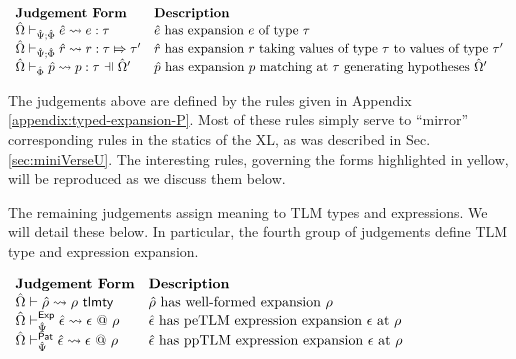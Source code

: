 \vspace{6px}
$\begin{array}{ll}
\textbf{Judgement Form} & \textbf{Description}\\
\expandsPX{\ue}{e}{\tau} & \text{$\ue$ has expansion $e$ of type $\tau$}\\
\rExpandsSP{\uOmega}{\uPsi}{\uPhi}{\urv}{r}{\tau}{\tau'} & \text{$\urv$ has expansion $r$ taking values of type $\tau$ to values of type $\tau'$}\\
\patExpandsP{\uOmega'}{\uPhi}{\upv}{p}{\tau} & \text{$\upv$ has expansion $p$ matching at $\tau$  generating hypotheses $\uOmega'$}
\end{array}$
\vspace{6px}

The judgements above are defined by the rules given in Appendix \ref{appendix:typed-expansion-P}. Most of these rules simply serve to ``mirror'' corresponding rules in the statics of the XL, as was described in Sec. \ref{sec:miniVerseU}. The interesting rules, governing the forms highlighted in yellow, will be reproduced as we discuss them below.

The remaining judgements assign meaning to TLM types and expressions. We will detail these below. In particular, the fourth group of judgements define TLM type and expression expansion.

\vspace{6px}
$\begin{array}{ll}
\textbf{Judgement Form} & \textbf{Description}\\
{\hat\Omega} \vdash {\hat\rho} \leadsto \rho ~\mathsf{tlmty} & \text{${\hat\rho}$ has well-formed expansion $\rho$}\\
{\hat\Omega} \vdash_{\hat{\Psi}}^{\mathsf{Exp}} {\hat\epsilon} \leadsto \epsilon~@~\rho & \text{${\hat\epsilon}$ has peTLM expression expansion $\epsilon$ at $\rho$}\\
{\hat\Omega} \vdash_{\hat{\Psi}}^{\mathsf{Pat}} {\hat\epsilon} \leadsto \epsilon~@~\rho & \text{${\hat\epsilon}$ has ppTLM expression expansion $\epsilon$ at $\rho$}
\end{array}$
\vspace{6px}

